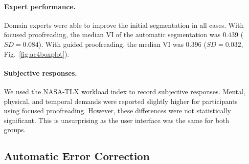\begin{table}[h]
\caption{Average proofreading speed for users of Dojo, Focused Proofreading (FP) and our Guided Proofreading (GP). For comparable correction time, our system achieves significantly higher VI reduction per minute (7.5$\times$) over state-of-the-art FP.}%
\label{tab:correctiontimes}
\end{table}

\paragraph{Expert performance.} Domain experts were able to improve the initial segmentation in all cases. With focused proofreading, the median VI of the automatic segmentation was $0.439$ ($SD=0.084$). With guided proofreading, the median VI was $0.396$ ($SD=0.032$, Fig.~\ref{fig:ac4boxplot}).

\paragraph{Subjective responses.} We used the NASA-TLX workload index to record subjective responses. Mental, physical, and temporal demands were reported slightly higher for participants using focused proofreading. However, these differences were not statistically significant. This is unsurprising as the user interface was the same for both groups.


\subsection{Automatic Error Correction}

